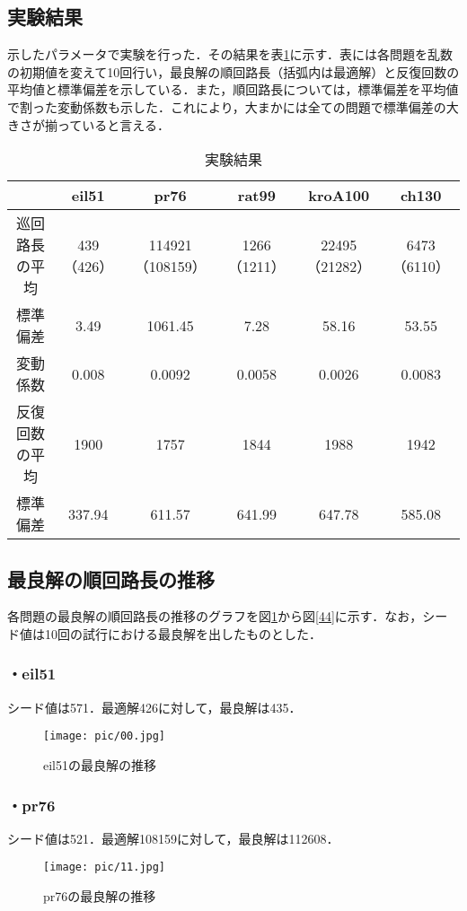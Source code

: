 \documentclass[a4j]{jarticle}
\begin{document}
\subsection*{実験結果}
示したパラメータで実験を行った．その結果を表\ref{result}に示す．表には各問題を乱数の初期値を変えて10回行い，最良解の順回路長（括弧内は最適解）と反復回数の平均値と標準偏差を示している．また，順回路長については，標準偏差を平均値で割った変動係数も示した．これにより，大まかには全ての問題で標準偏差の大きさが揃っていると言える．

\begin{table}[H]
 \begin{center}
  \caption{実験結果}
  \label{result}
  \begin{tabular}[tb]{|c|c|c|c|c|c|} \hline
 & eil51 & pr76 & rat99 & kroA100 & ch130 \\\hline
巡回路長の平均 & 439（426） & 114921（108159） & 1266（1211） & 22495（21282） & 6473（6110） \\\hline
標準偏差 & 3.49 & 1061.45 & 7.28 & 58.16 & 53.55 \\\hline
変動係数 & 0.008 & 0.0092 & 0.0058 & 0.0026 & 0.0083 \\ \hline
反復回数の平均 & 1900 & 1757 & 1844 & 1988 & 1942 \\\hline
標準偏差 & 337.94 & 611.57 & 641.99 & 647.78 & 585.08 \\\hline
  \end{tabular}
 \end{center}
\end{table}

\subsection*{最良解の順回路長の推移}
各問題の最良解の順回路長の推移のグラフを図\ref{00}から図\ref{44}に示す．なお，シード値は10回の試行における最良解を出したものとした．

\subsubsection*{・eil51}
シード値は571．最適解426に対して，最良解は435．
\begin{figure}[H]
 \begin{center}
  \texttt{[image: pic/00.jpg]}
  \caption{eil51の最良解の推移}
  \label{00}
 \end{center}
\end{figure}
\clearpage
\subsubsection*{・pr76}
シード値は521．最適解108159に対して，最良解は112608．
\begin{figure}[H]
 \begin{center}
  \texttt{[image: pic/11.jpg]}
  \caption{pr76の最良解の推移}
  \label{11}
 \end{center}
\end{figure}
\end{document}

